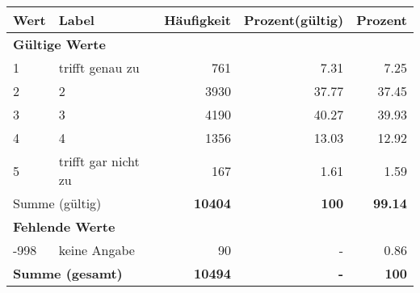      \begin{longtable}{lXrrr}
     \toprule
     \textbf{Wert} & \textbf{Label} & \textbf{Häufigkeit} & \textbf{Prozent(gültig)} & \textbf{Prozent} \\
     \endhead
     \midrule
     \multicolumn{5}{l}{\textbf{Gültige Werte}}\\

     1 &
     \multicolumn{1}{X}{ trifft genau zu   } &


       \num{761} &
       \num[round-mode=places,round-precision=2]{7.31} &
         \num[round-mode=places,round-precision=2]{7.25} \\

     2 &
     \multicolumn{1}{X}{ 2   } &


       \num{3930} &
       \num[round-mode=places,round-precision=2]{37.77} &
         \num[round-mode=places,round-precision=2]{37.45} \\

     3 &
     \multicolumn{1}{X}{ 3   } &


       \num{4190} &
       \num[round-mode=places,round-precision=2]{40.27} &
         \num[round-mode=places,round-precision=2]{39.93} \\

     4 &
     \multicolumn{1}{X}{ 4   } &


       \num{1356} &
       \num[round-mode=places,round-precision=2]{13.03} &
         \num[round-mode=places,round-precision=2]{12.92} \\

     5 &
     \multicolumn{1}{X}{ trifft gar nicht zu   } &


       \num{167} &
       \num[round-mode=places,round-precision=2]{1.61} &
         \num[round-mode=places,round-precision=2]{1.59} \\
     \midrule
     \multicolumn{2}{l}{Summe (gültig)} &
       \textbf{\num{10404}} &
     \textbf{\num{100}} &
       \textbf{\num[round-mode=places,round-precision=2]{99.14}} \\
     \multicolumn{5}{l}{\textbf{Fehlende Werte}}\\
       -998 &
       keine Angabe &
         \num{90} &
        - &
         \num[round-mode=places,round-precision=2]{0.86} \\
     \midrule
     \multicolumn{2}{l}{\textbf{Summe (gesamt)}} &
          \textbf{\num{10494}} &
        \textbf{-} &
        \textbf{\num{100}} \\
     \bottomrule
     \end{longtable}
     
